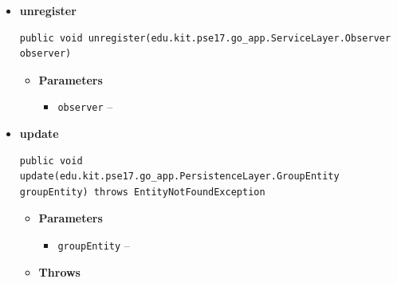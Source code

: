 \documentclass[11pt,a4paper]{report}
\begin{document}
{{{{{{{{{{{{{{\begin{itemize}
{\begin{itemize}
{\begin{itemize}
{\texttt{observer} -- }
  \end{itemize}
}%
\end{itemize}
}%
\item{ 
\hypertarget{edu.kit.pse17.go_app.PersistenceLayer.daos.GroupDaoImp.unregister(edu.kit.pse17.go_app.ServiceLayer.Observer)}{{\bf  unregister}\\}
\begin{lstlisting}[frame=none]
public void unregister(edu.kit.pse17.go_app.ServiceLayer.Observer observer)\end{lstlisting} %
\begin{itemize}
\item{
{\bf  Parameters}
  \begin{itemize}
   \item{
\texttt{observer} -- }
  \end{itemize}
}%
\end{itemize}
}%
\item{ 
\hypertarget{edu.kit.pse17.go_app.PersistenceLayer.daos.GroupDaoImp.update(edu.kit.pse17.go_app.PersistenceLayer.GroupEntity)}{{\bf  update}\\}
\begin{lstlisting}[frame=none]
public void update(edu.kit.pse17.go_app.PersistenceLayer.GroupEntity groupEntity) throws EntityNotFoundException\end{lstlisting} %
\begin{itemize}
\item{
{\bf  Parameters}
  \begin{itemize}
   \item{
\texttt{groupEntity} -- }
  \end{itemize}
}%
\item{{\bf  Throws}
}%
\end{itemize}
}%
\end{itemize}
}
}
}}}}}}}}}}}}
\end{document}
